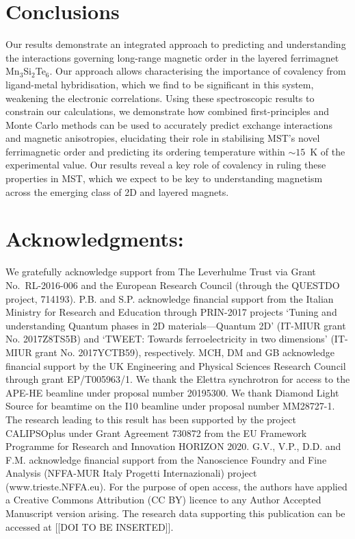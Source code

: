 \documentclass[preprint,amsmath,amssymb,aps,nofootinbib,superscriptaddress]{revtex4-2}
\begin{document}
\section{Conclusions}
Our results demonstrate an integrated approach to predicting and understanding the interactions governing long-range magnetic order in the layered ferrimagnet Mn$_3$Si$_2$Te$_6$. Our approach allows characterising the importance of covalency from ligand-metal hybridisation, which we find to be significant in this system, weakening the electronic correlations. Using these spectroscopic results to constrain our calculations, we demonstrate how combined first-principles and Monte Carlo methods can be used to accurately predict exchange interactions and magnetic anisotropies, elucidating their role in stabilising MST's novel ferrimagnetic order and predicting its ordering temperature within $\sim\!15$~K of the experimental value. Our results reveal a key role of covalency in ruling these properties in MST, which we expect to be key to understanding magnetism across the emerging class of 2D and layered magnets.

\section*{Acknowledgments:} We gratefully acknowledge support from The Leverhulme Trust via Grant No.~RL-2016-006 and the European Research Council (through the QUESTDO project, 714193). P.B. and S.P. acknowledge financial support from the Italian Ministry for Research and Education through PRIN-2017 projects ‘Tuning and understanding Quantum phases in 2D materials—Quantum 2D’ (IT-MIUR grant No. 2017Z8TS5B) and ‘TWEET: Towards ferroelectricity in two dimensions’ (IT-MIUR grant No. 2017YCTB59), respectively. MCH, DM and GB acknowledge financial support by the UK Engineering and Physical Sciences Research Council through grant EP/T005963/1. We thank the Elettra synchrotron for access to the APE-HE beamline under proposal number 20195300. We thank Diamond Light Source for beamtime on the I10 beamline under proposal number MM28727-1. The research leading to this result has been supported by the project CALIPSOplus under Grant Agreement 730872 from the EU Framework Programme for Research and Innovation HORIZON 2020. G.V., V.P., D.D. and F.M. acknowledge financial support from the Nanoscience Foundry and Fine Analysis (NFFA-MUR Italy Progetti Internazionali) project (www.trieste.NFFA.eu). For the purpose of open access, the authors have applied a Creative Commons Attribution (CC BY) licence to any Author Accepted Manuscript version arising. The research data supporting this publication can be accessed at [[DOI TO BE INSERTED]].
\end{document}
